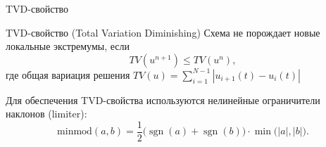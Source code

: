 \documentclass[ignoreonframetext,unicode,aspectratio=169]{beamer}
\begin{document}
	\appendix
	
	
	
	
	
	
	
	
	
	
	\begin{frame}{TVD-свойство}
	
	\begin{block}{TVD-свойство (Total Variation Diminishing)}
		Схема не порождает новые локальные экстремумы, если
		\vspace{-0.2 cm}
		\[
		TV(u^{n+1}) \leq TV(u^{n}),
		\]
		где общая вариация решения $TV(u) = \sum_{i = 1}^{N - 1} |u_{i + 1}(t) - u_i(t)|$
	\end{block}
	
	Для обеспечения TVD-свойства используются нелинейные ограничители наклонов (limiter):
	\vspace{-0.3 cm}
	\[
	\text{minmod}(a,b) = \frac{1}{2} \big( \operatorname{sgn}(a) + \operatorname{sgn}(b) \big) \cdot \min\big( |a|, |b| \big).
	\]
\end{frame}
\end{document}
